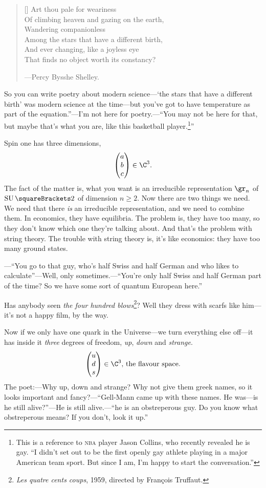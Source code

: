 \documentclass[10pt, a4paper, twoside]{lecturenotes}
\begin{document}
\begin{lecture}[date=2013-04-30, official=true]
\begin{verse}[\versewidth]
Art thou pale for weariness \\
Of climbing heaven and gazing on the earth,\\
Wandering companionless\\
Among the stars that have a different birth,\\
And ever changing, like a joyless eye\\
That finds no object worth its constancy?
\begin{flushright}
---Percy Bysshe Shelley.
\end{flushright}
\end{verse}
So you can write poetry about modern science---`the stars that have a different birth' was modern science at the time---but you've got to have temperature as part of the equation.''---I'm not here for poetry.---``You may not be here for that, but maybe that's what you are, like this basketball player.\footnote{This is a reference to \textsc{nba} player Jason Collins, who recently revealed he is gay. ``I didn't set out to be the first openly gay athlete playing in a major American team sport. But since I am, I'm happy to start the conversation.''}''

Spin one has three dimensions,\[
\begin{pmatrix}
a\\ b\\ c
\end{pmatrix}\in\C^3\text.
\] The fact of the matter is, what you want is an irreducible representation $\gr_n$ of $\SpecialUnitaryGroup\of 2$ of dimension $n\geq 2$. Now there are two things we need. We need that there \emph{is} an irreducible representation, and we need to combine them. In economics, they have equilibria. The problem is, they have too many, so they don't know which one they're talking about. And that's the problem with string theory. The trouble with string theory is, it's like economics: they have too many ground states.

---``You go to that guy, who's half Swiss and half German and who likes to calculate''---Well, only sometimes.---``You're only half Swiss and half German part of the time? So we have some sort of quantum European here.'' 

Has anybody seen \emph{the four hundred blows}\footnote{\emph{Les quatre cents coups}, 1959, directed by François Truffaut.}? Well they dress with scarfs like him---it's not a happy film, by the way.

Now if we only have one quark in the Universe---we turn everything else off---it has inside it \emph{three} degrees of freedom, \emph{up}, \emph{down} and \emph{strange}.
\[
\begin{pmatrix}
u\\ d\\ s
\end{pmatrix}\in \C^3 \text{, the flavour space.}
\]
The poet:---Why up, down and strange? Why not give them greek names, so it looks important and fancy?---``Gell-Mann came up with these names. He was---is he still alive?''---He is still alive.---``he is an obstreperous guy. Do you know what obstreperous means? If you don't, look it up.'' 


\end{lecture}
\end{document}
